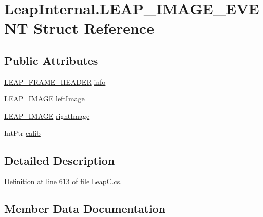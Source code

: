 \hypertarget{struct_leap_internal_1_1_l_e_a_p___i_m_a_g_e___e_v_e_n_t}{}\section{Leap\+Internal.\+L\+E\+A\+P\+\_\+\+I\+M\+A\+G\+E\+\_\+\+E\+V\+E\+NT Struct Reference}
\label{struct_leap_internal_1_1_l_e_a_p___i_m_a_g_e___e_v_e_n_t}
\subsection*{Public Attributes}
\begin{DoxyCompactItemize}
\item 
\mbox{\hyperlink{struct_leap_internal_1_1_l_e_a_p___f_r_a_m_e___h_e_a_d_e_r}{L\+E\+A\+P\+\_\+\+F\+R\+A\+M\+E\+\_\+\+H\+E\+A\+D\+ER}} \mbox{\hyperlink{struct_leap_internal_1_1_l_e_a_p___i_m_a_g_e___e_v_e_n_t_a62830a007091de2301d534180d15ea29}{info}}
\item 
\mbox{\hyperlink{struct_leap_internal_1_1_l_e_a_p___i_m_a_g_e}{L\+E\+A\+P\+\_\+\+I\+M\+A\+GE}} \mbox{\hyperlink{struct_leap_internal_1_1_l_e_a_p___i_m_a_g_e___e_v_e_n_t_aa5149c76fb1f9fc4576789f16ff835a7}{left\+Image}}
\item 
\mbox{\hyperlink{struct_leap_internal_1_1_l_e_a_p___i_m_a_g_e}{L\+E\+A\+P\+\_\+\+I\+M\+A\+GE}} \mbox{\hyperlink{struct_leap_internal_1_1_l_e_a_p___i_m_a_g_e___e_v_e_n_t_abefeed29a7ec30a74ed5ba64316eaa7e}{right\+Image}}
\item 
Int\+Ptr \mbox{\hyperlink{struct_leap_internal_1_1_l_e_a_p___i_m_a_g_e___e_v_e_n_t_a63307324f7a9b17d2e2d7c3dafd59d63}{calib}}
\end{DoxyCompactItemize}


\subsection{Detailed Description}


Definition at line 613 of file Leap\+C.\+cs.



\subsection{Member Data Documentation}
\mbox{\label{struct_leap_internal_1_1_l_e_a_p___i_m_a_g_e___e_v_e_n_t_a63307324f7a9b17d2e2d7c3dafd59d63}} 
